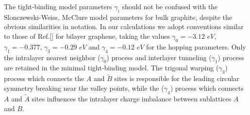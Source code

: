 \documentclass[twocolumn,prb,showpacs,preprintnumbers,amsmath,amssymb]{revtex4}
\begin{document}
The tight-binding model parameters $\gamma_i$ should not be confused with the 
Slonczewski-Weiss, McClure \cite{swm} model parameters for bulk graphite,
despite the obvious similarities in notation. 
In our calculations we adopt conventions similar to those of Ref.[]
for bilayer graphene, taking the values $\gamma_0 = -3.12 \,\, eV$, $\gamma_1 = -0.377$,
$\gamma_3 = -0.29 \,\, eV$ and $\gamma_4 = -0.12 \,\, eV$ for the hopping parameters.
Only the intralayer nearest neighbor ($\gamma_0$) process and interlayer tunneling ($\gamma_1$) 
process are retained in the minimal tight-binding model. 
The trigonal warping ($\gamma_3$) process which connects the $A$ and $\widetilde{B}$ sites 
is responsible for the leading circular symmetry breaking near the 
valley points,
while the ($\gamma_4$) process which connects $A$ and $\widetilde{A}$ sites 
influences the intralayer charge imbalance between sublattices $A$ and $B$. 
\end{document}
